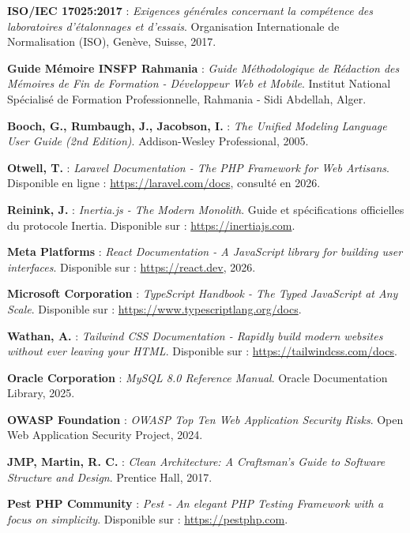 \documentclass{bts-report}
\begin{document}
\begin{enumerate}[label={[\arabic*]}]
  \item \textbf{ISO/IEC 17025:2017} : \textit{Exigences g\'en\'erales concernant la comp\'etence des laboratoires d'\'etalonnages et d'essais}. Organisation Internationale de Normalisation (ISO), Gen\`eve, Suisse, 2017.
  \item \textbf{Guide M\'emoire INSFP Rahmania} : \textit{Guide M\'ethodologique de R\'edaction des M\'emoires de Fin de Formation - D\'eveloppeur Web et Mobile}. Institut National Sp\'ecialis\'e de Formation Professionnelle, Rahmania - Sidi Abdellah, Alger.
  \item \textbf{Booch, G., Rumbaugh, J., Jacobson, I.} : \textit{The Unified Modeling Language User Guide (2nd Edition)}. Addison-Wesley Professional, 2005.
  \item \textbf{Otwell, T.} : \textit{Laravel Documentation - The PHP Framework for Web Artisans}. Disponible en ligne : \url{https://laravel.com/docs}, consult\'e en 2026.
  \item \textbf{Reinink, J.} : \textit{Inertia.js - The Modern Monolith}. Guide et sp\'ecifications officielles du protocole Inertia. Disponible sur : \url{https://inertiajs.com}.
  \item \textbf{Meta Platforms} : \textit{React Documentation - A JavaScript library for building user interfaces}. Disponible sur : \url{https://react.dev}, 2026.
  \item \textbf{Microsoft Corporation} : \textit{TypeScript Handbook - The Typed JavaScript at Any Scale}. Disponible sur : \url{https://www.typescriptlang.org/docs}.
  \item \textbf{Wathan, A.} : \textit{Tailwind CSS Documentation - Rapidly build modern websites without ever leaving your HTML}. Disponible sur : \url{https://tailwindcss.com/docs}.
  \item \textbf{Oracle Corporation} : \textit{MySQL 8.0 Reference Manual}. Oracle Documentation Library, 2025.
  \item \textbf{OWASP Foundation} : \textit{OWASP Top Ten Web Application Security Risks}. Open Web Application Security Project, 2024.
  \item \textbf{JMP, Martin, R. C.} : \textit{Clean Architecture: A Craftsman's Guide to Software Structure and Design}. Prentice Hall, 2017.
  \item \textbf{Pest PHP Community} : \textit{Pest - An elegant PHP Testing Framework with a focus on simplicity}. Disponible sur : \url{https://pestphp.com}.
\end{enumerate}
\end{document}
